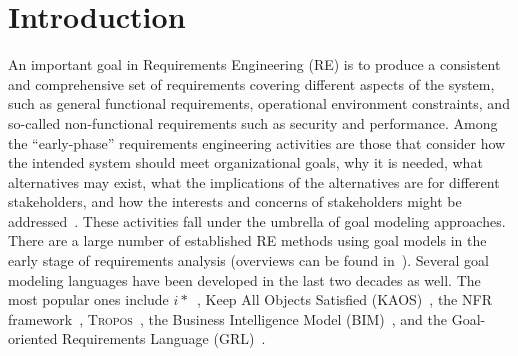 \section{Introduction}
\label{sect:introduction}

An important goal in Requirements Engineering (RE) is to produce a consistent and comprehensive set of requirements covering different aspects of the system, such as general functional requirements, operational environment constraints, and so-called non-functional requirements such as security and performance. Among the ``early-phase'' requirements engineering activities are those that consider how the intended system should meet organizational goals, why it is needed, what alternatives may exist, what the implications of the alternatives are for different stakeholders, and how the interests and concerns of stakeholders might be addressed~\cite{yu1997towards}. These activities fall under the umbrella of goal modeling approaches. There are a large number of established RE methods using goal models in the early stage of requirements analysis (overviews can be found in~\cite{kavakliL05,van2001goal}). Several goal modeling languages have been developed in the last two decades as well. The most popular ones include $i*$~\cite{yu1997towards}, Keep All Objects Satisfied (KAOS)~\cite{van2008requirements}, the NFR framework~\cite{chung2012non}, \textsc{Tropos}~\cite{giorgini2005goal}, the Business Intelligence Model (BIM)~\cite{horkoff2014strategic}, and the Goal-oriented Requirements Language (GRL)~\cite{Amyot:2010:EGM:1841349.1841356}.



